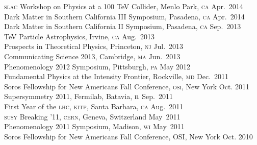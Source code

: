 \documentclass[margin,line]{resume}
\newcommand{\scap}[1]{\textsc{\MakeLowercase{#1}}}
\begin{document}
\begin{resume}
% 
\scap{SLAC} Workshop on Physics at a 100 TeV Collider, Menlo Park, \scap{CA}
\hfill Apr.~2014\vspace{.7mm}\\   
%
Dark Matter in Southern California III Symposium, Pasadena, \scap{CA}
\hfill Apr.~2014\vspace{.7mm}\\   
%   
Dark Matter in Southern California II Symposium, Pasadena, \scap{CA}
\hfill Sep.~2013\vspace{.7mm}\\
%
TeV Particle Astrophysics, Irvine, \scap{CA }
\hfill Aug.~2013\vspace{.7mm}\\
%
Prospects in Theoretical Physics, Princeton, \scap{NJ}
\hfill Jul.~2013\vspace{.7mm}\\
%
Communicating Science 2013, Cambridge, \scap{MA}
\hfill Jun.~2013\vspace{.7mm}\\
%
Phenomenology 2012 Symposium, Pittsburgh, \scap{PA}
\hfill May 2012\vspace{.7mm}\\
%
Fundamental Physics at the Intensity Frontier, Rockville, \scap{MD}
\hfill Dec.~2011\vspace{.7mm}\\
%
Soros Fellowship for New Americans Fall Conference, \scap{OSI}, New York 
\hfill 
Oct. 2011\vspace{.7mm}\\
%
Supersymmetry 2011, Fermilab, Batavia, \scap{IL}
\hfill 
Sep.~2011\vspace{.7mm}\\
%
First Year of the \scap{LHC}, \scap{KITP}, Santa Barbara, \scap{CA}
\hfill 
Aug.~2011\vspace{.7mm}\\
%
\scap{SUSY} Breaking '11, \scap{CERN}, Geneva, Switzerland
\hfill
May~2011\vspace{.7mm}\\
%
Phenomenology 2011 Symposium, Madison, \scap{WI}
\hfill 
May~2011\vspace{.7mm}\\
%
Soros Fellowship for New Americans Fall Conference, OSI, New York
\hfill 
Oct. 2010\vspace{.7mm}\\

\end{resume}
\end{document}

